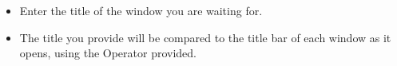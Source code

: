 \begin{itemize}
\item Enter the title of the window you are waiting for. 
\item The title you provide will be compared to the title bar of each window as it opens, using the Operator provided.
\end{itemize}

